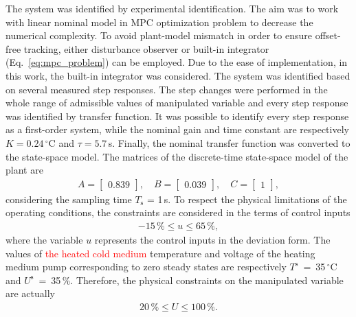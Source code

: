 \documentclass[preprint,12pt]{elsarticle}
\newcommand{\change}[1]{\textcolor{red}{#1}}
\begin{document}
The system was identified by experimental identification. The aim was to work with linear nominal model in MPC optimization problem to decrease the numerical complexity. To avoid plant-model mismatch in order to ensure offset-free tracking, either disturbance observer or built-in integrator (Eq.~\eqref{eq:mpc_problem}) can be employed. Due to the ease of implementation, in this work, the built-in integrator was considered. The system was identified based on several measured step responses. The step changes were performed in the whole range of admissible values of manipulated variable and every step response was identified by transfer function. It was possible to identify every step response as a first-order system, while the nominal gain and time constant are respectively $K = 0.24\,^{\circ}\mathrm{C}$ and $\tau = 5.7$\,s. 
Finally, the nominal transfer function was converted to the state-space model. The matrices of the discrete-time state-space model of the plant are
\begin{subequations}
	\label{eq:model_A_B} 
	\begin{eqnarray}
		A = \begin{bmatrix}
			0.839
		\end{bmatrix}, \quad
		B = \begin{bmatrix}
			0.039
		\end{bmatrix}, \quad
		C = \begin{bmatrix}
			1
		\end{bmatrix}, 
	\end{eqnarray}
\end{subequations}
considering the sampling time $T_\mathrm{s}$ = 1\,s. 
To respect the physical limitations of the operating conditions, the constraints are considered in the terms of control inputs
\begin{eqnarray}
	\label{eq:u_const}
	-15\,\% \le u \le 65\,\%,
\end{eqnarray}
where the variable $u$ represents the control inputs in the deviation form. The values of \change{the heated cold medium} temperature and voltage of the heating medium pump corresponding to zero steady states are respectively $T^\mathrm{s}$~=~35\,$^{\circ}\mathrm{C}$ and $U^\mathrm{s}$~=~35\,\%. Therefore, the physical constraints on the manipulated variable are actually
\begin{eqnarray}
	\label{eq:U_const}
	20\,\% \le U \le 100\,\%.
\end{eqnarray}	
\end{document}
